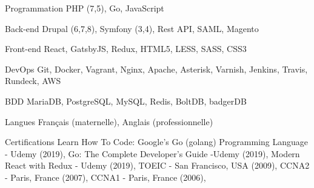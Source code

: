 

\begin{cvskills}

  \cvskill
    {Programmation} %
    {PHP (7,5), Go, JavaScript} %

  \cvskill
    {Back-end} %
    {Drupal (6,7,8), Symfony (3,4), Rest API, SAML, Magento} %

  \cvskill
    {Front-end} %
    {React, GatsbyJS, Redux, HTML5, LESS, SASS, CSS3} %

  \cvskill
    {DevOps} %
    {Git, Docker, Vagrant, Nginx, Apache, Asterisk, Varnish, Jenkins, Travis, Rundeck, AWS} %

  \cvskill
    {BDD} %
    {MariaDB, PostgreSQL, MySQL, Redis, BoltDB, badgerDB} %

  \cvskill
    {Langues} %
    {Français (maternelle), Anglais (professionnelle)} %

  \cvskill
  {Certifications} %
  {
  Learn How To Code: Google’s Go (golang) Programming Language - Udemy (2019),
  Go: The Complete Developer’s Guide -Udemy (2019),
  Modern React with Redux - Udemy (2019),
  TOEIC - San Francisco, USA (2009),
  CCNA2 - Paris, France (2007),
  CCNA1 - Paris, France (2006),
  } %

\end{cvskills}
